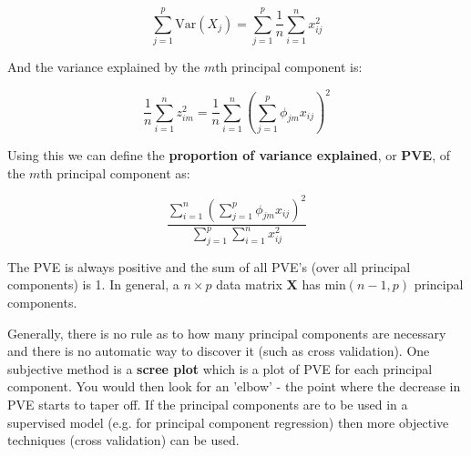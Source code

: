 $$ \sum_{j=1}^{p} \text{Var}(X_{j}) = \sum^{p}_{j=1}\frac{1}{n}\sum_{i=1}^{n}x_{ij}^{2} $$

And the variance explained by the $m$th principal component is:

$$ \frac{1}{n}\sum_{i=1}^{n}z_{im}^{2} = \frac{1}{n}\sum_{i=1}^{n}\left( \sum_{j=1}^{p}\phi_{jm}x_{ij} \right)^{2} $$

Using this we can define the \textbf{proportion of variance explained}, or \textbf{PVE}, of the $m$th principal component as:

$$ \frac{\sum_{i=1}^{n}\left( \sum_{j=1}^{p}\phi_{jm}x_{ij} \right)^{2}}{\sum^{p}_{j=1}\sum_{i=1}^{n}x_{ij}^{2}} $$

The PVE is always positive and the sum of all PVE's (over all principal components) is 1. In general, a $n\times p$ data matrix $\mathbf{X}$ has $\text{min}(n-1,p)$ principal components.

Generally, there is no rule as to how many principal components are necessary and there is no automatic way to discover it (such as cross validation). One subjective method is a \textbf{scree plot} which is a plot of PVE for each principal component. You would then look for an 'elbow' - the point where the decrease in PVE starts to taper off. If the principal components are to be used in a supervised model (e.g. for principal component regression) then more objective techniques (cross validation) can be used.
